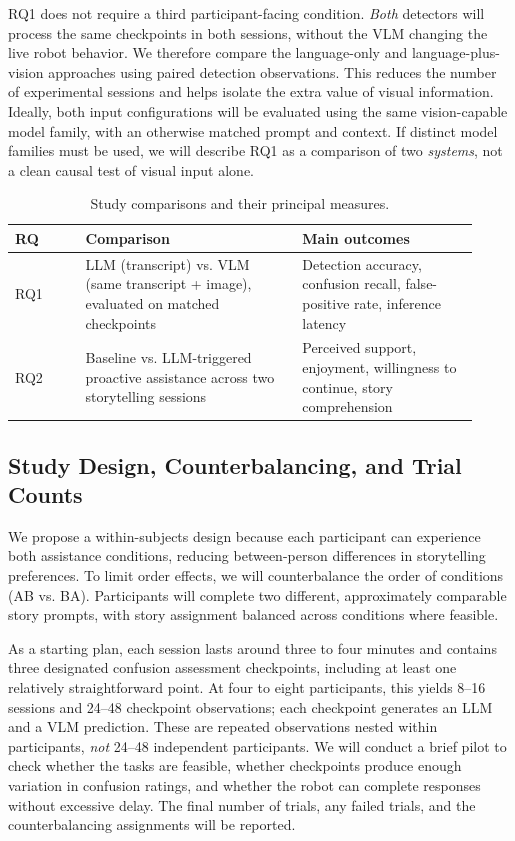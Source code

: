 \documentclass[conference]{IEEEtran}
\begin{document}
RQ1 does not require a third participant-facing condition. \emph{Both} detectors will process the same checkpoints in both sessions, without the VLM changing the live robot behavior. We therefore compare the language-only and language-plus-vision approaches using paired detection observations. This reduces the number of experimental sessions and helps isolate the extra value of visual information. Ideally, both input configurations will be evaluated using the same vision-capable model family, with an otherwise matched prompt and context. If distinct model families must be used, we will describe RQ1 as a comparison of two \emph{systems}, not a clean causal test of visual input alone.

\begin{table}[htbp]
\centering
\small
\caption{Study comparisons and their principal measures.}
\begin{tabular}{@{}p{0.14\linewidth}p{0.43\linewidth}p{0.35\linewidth}@{}}
\toprule
\textbf{RQ} & \textbf{Comparison} & \textbf{Main outcomes}\\
\midrule
RQ1 & LLM (transcript) vs. VLM (same transcript + image), evaluated on matched checkpoints & Detection accuracy, confusion recall, false-positive rate, inference latency\\
RQ2 & Baseline vs. LLM-triggered proactive assistance across two storytelling sessions & Perceived support, enjoyment, willingness to continue, story comprehension\\
\bottomrule
\end{tabular}
\label{tab:comparisons}
\end{table}

\subsection{Study Design, Counterbalancing, and Trial Counts}
We propose a within-subjects design because each participant can experience both assistance conditions, reducing between-person differences in storytelling preferences. To limit order effects, we will counterbalance the order of conditions (AB vs. BA). Participants will complete two different, approximately comparable story prompts, with story assignment balanced across conditions where feasible.

As a starting plan, each session lasts around three to four minutes and contains three designated confusion assessment checkpoints, including at least one relatively straightforward point. At four to eight participants, this yields 8--16 sessions and 24--48 checkpoint observations; each checkpoint generates an LLM and a VLM prediction. These are repeated observations nested within participants, \emph{not} 24--48 independent participants. We will conduct a brief pilot to check whether the tasks are feasible, whether checkpoints produce enough variation in confusion ratings, and whether the robot can complete responses without excessive delay. The final number of trials, any failed trials, and the counterbalancing assignments will be reported.
\end{document}
